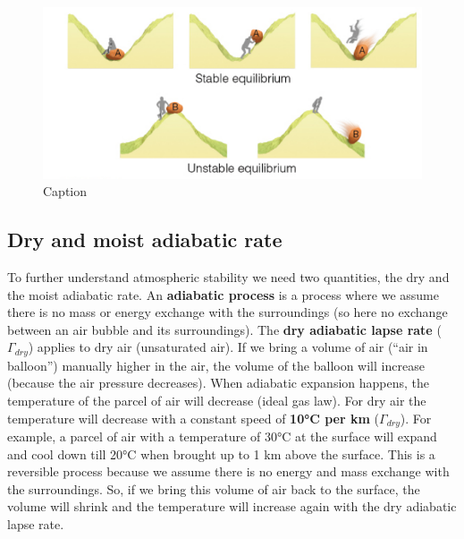 \documentclass[12pt,oneside]{book}
\begin{document}
\begin{figure}

{\centering \includegraphics[width=0.8\linewidth]{figures/Figure31} 

}

\caption{Caption}\label{fig:Stable}
\end{figure}

\subsection{Dry and moist adiabatic
rate}\label{dry-and-moist-adiabatic-rate}

To further understand atmospheric stability we need two quantities, the
dry and the moist adiabatic rate. An \textbf{adiabatic process} is a
process where we assume there is no mass or energy exchange with the
surroundings (so here no exchange between an air bubble and its
surroundings). The \textbf{dry adiabatic lapse rate} (\(\Gamma_{dry}\))
applies to dry air (unsaturated air). If we bring a volume of air (``air
in balloon'') manually higher in the air, the volume of the balloon will
increase (because the air pressure decreases). When adiabatic expansion
happens, the temperature of the parcel of air will decrease (ideal gas
law). For dry air the temperature will decrease with a constant speed of
\textbf{10°C per km} (\(\Gamma_{dry}\)). For example, a parcel of air
with a temperature of 30°C at the surface will expand and cool down till
20°C when brought up to 1 km above the surface. This is a reversible
process because we assume there is no energy and mass exchange with the
surroundings. So, if we bring this volume of air back to the surface,
the volume will shrink and the temperature will increase again with the
dry adiabatic lapse rate.
\end{document}
